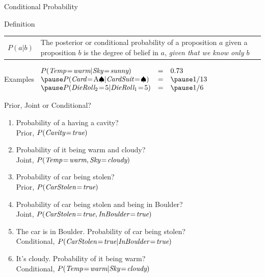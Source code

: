 \documentclass[12pt]{beamer}
\newcommand{\EM}[1]{\mbox{\em#1}}
\newcommand{\tab}{\hspace{1em}}
\begin{document}
\begin{frame}{Conditional Probability}
	\begin{block}{Definition}
		\begin{tabular}{lm{3.4in}@{}}
			\large $P(a|b)$
			&
			The \alert{posterior} or \alert{conditional probability} of a proposition $a$ given a proposition $b$ is the degree of belief in $a$, \emph{given that we know only $b$}
		\end{tabular}
	\end{block}
	\pause
	\begin{block}{Examples}
		$
		\begin{array}{lll}
			P(\EM{Temp} \!=\! \EM{warm}|\EM{Sky} \!=\! \EM{sunny})
			 & = & 0.73 \\
			\pause
			P(\EM{Card} \!=\! \mbox{A}\spadesuit|\EM{CardSuit} \!=\! \spadesuit)
			 & = & \pause 1/13 \\
			\pause
			P(\EM{DieRoll}_2 \!=\! 5|\EM{DieRoll}_1 \!=\! 5)
			 & = & \pause 1/6 \\
		\end{array}
		$
	\end{block}
\end{frame}
\begin{frame}{Prior, Joint or Conditional?}
	\begin{enumerate}
		\item Probability of a having a cavity? \\
			\pause \tab Prior, $P(\EM{Cavity}\!=\!\EM{true})$
		\pause
		\item Probability of it being warm and cloudy? \\
			\pause \tab Joint, $P(\EM{Temp}\!=\!\EM{warm}, \EM{Sky}\!=\!\EM{cloudy})$
		\pause
		\item Probability of car being stolen? \\
			\pause \tab Prior, $P(\EM{CarStolen}\!=\!\EM{true})$
		\pause
		\item Probability of car being stolen and being in Boulder? \\
			\pause \tab Joint, $P(\EM{CarStolen}\!=\!\EM{true}, \EM{InBoulder}\!=\!\EM{true})$
		\pause
		\item The car is in Boulder. Probability of car being stolen? \\
			\pause \tab Conditional, $P(\EM{CarStolen}\!=\!\EM{true}|\EM{InBoulder}\!=\!\EM{true})$
		\pause
		\item It's cloudy. Probability of it being warm? \\
			\pause \tab Conditional, $P(\EM{Temp}\!=\!\EM{warm}| \EM{Sky}\!=\!\EM{cloudy})$
	\end{enumerate}
\end{frame}
\end{document}
